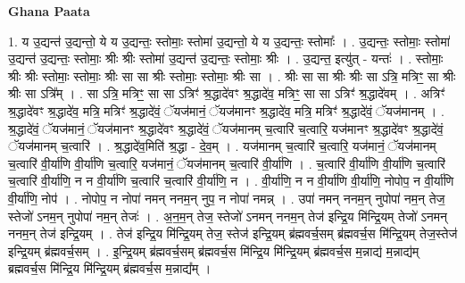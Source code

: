 \documentclass[17pt]{extarticle}
\begin{document}
\textbf{Ghana Paata } \newline

1. य उ॒द्यन्त॑ उ॒द्यन्तो॒ ये य उ॒द्यन्तः॒ स्तोमाः॒ स्तोमा॑ उ॒द्यन्तो॒ ये य उ॒द्यन्तः॒ स्तोमाः᳚ । . उ॒द्यन्तः॒ स्तोमाः॒ स्तोमा॑ उ॒द्यन्त॑ उ॒द्यन्तः॒ स्तोमाः॒ श्रीः श्रीः स्तोमा॑ उ॒द्यन्त॑ उ॒द्यन्तः॒ स्तोमाः॒ श्रीः । . उ॒द्यन्त॒ इत्यु॑त् - यन्तः॑ । . स्तोमाः॒ श्रीः श्रीः स्तोमाः॒ स्तोमाः॒ श्रीः सा सा श्रीः स्तोमाः॒ स्तोमाः॒ श्रीः सा । . श्रीः सा सा श्रीः श्रीः सा ऽत्रि॒ मत्रिꣳ॒॒ सा श्रीः श्रीः सा ऽत्रि᳚म् । . सा ऽत्रि॒ मत्रिꣳ॒॒ सा सा ऽत्रिꣳ॑ श्र॒द्धादे॑वꣳ श्र॒द्धादे॑व॒ मत्रिꣳ॒॒ सा सा ऽत्रिꣳ॑ श्र॒द्धादे॑वम् । . अत्रिꣳ॑ श्र॒द्धादे॑वꣳ श्र॒द्धादे॑व॒ मत्रि॒ मत्रिꣳ॑ श्र॒द्धादे॑वं॒ ॅयज॑मानं॒ ॅयज॑मानꣳ श्र॒द्धादे॑व॒ मत्रि॒ मत्रिꣳ॑ श्र॒द्धादे॑वं॒ ॅयज॑मानम् । . श्र॒द्धादे॑वं॒ ॅयज॑मानं॒ ॅयज॑मानꣳ श्र॒द्धादे॑वꣳ श्र॒द्धादे॑वं॒ ॅयज॑मानम् च॒त्वारि॑ च॒त्वारि॒ यज॑मानꣳ श्र॒द्धादे॑वꣳ श्र॒द्धादे॑वं॒ ॅयज॑मानम् च॒त्वारि॑ । . श्र॒द्धादे॑व॒मिति॑ श्र॒द्धा - दे॒व॒म् । . यज॑मानम् च॒त्वारि॑ च॒त्वारि॒ यज॑मानं॒ ॅयज॑मानम् च॒त्वारि॑ वी॒र्या॑णि वी॒र्या॑णि च॒त्वारि॒ यज॑मानं॒ ॅयज॑मानम् च॒त्वारि॑ वी॒र्या॑णि । . च॒त्वारि॑ वी॒र्या॑णि वी॒र्या॑णि च॒त्वारि॑ च॒त्वारि॑ वी॒र्या॑णि॒ न न वी॒र्या॑णि च॒त्वारि॑ च॒त्वारि॑ वी॒र्या॑णि॒ न । . वी॒र्या॑णि॒ न न वी॒र्या॑णि वी॒र्या॑णि॒ नोपोप॒ न वी॒र्या॑णि वी॒र्या॑णि॒ नोप॑ । . नोपोप॒ न नोपा॑ नमन् ननम॒न् नुप॒ न नोपा॑ नमन्न् । . उपा॑ नमन् ननम॒न् नुपोपा॑ नम॒न् तेज॒ स्तेजो॑ ऽनम॒न् नुपोपा॑ नम॒न् तेजः॑ । . अ॒न॒म॒न् तेज॒ स्तेजो॑ ऽनमन् ननम॒न् तेज॑ इन्द्रि॒य मि॑न्द्रि॒यम् तेजो॑ ऽनमन् ननम॒न् तेज॑ इन्द्रि॒यम् । . तेज॑ इन्द्रि॒य मि॑न्द्रि॒यम् तेज॒ स्तेज॑ इन्द्रि॒यम् ब्र॑ह्मवर्च॒सम् ब्र॑ह्मवर्च॒स मि॑न्द्रि॒यम् तेज॒स्तेज॑ इन्द्रि॒यम् ब्र॑ह्मवर्च॒सम् । . इ॒न्द्रि॒यम् ब्र॑ह्मवर्च॒सम् ब्र॑ह्मवर्च॒स मि॑न्द्रि॒य मि॑न्द्रि॒यम् ब्र॑ह्मवर्च॒स म॒न्नाद्य॑ म॒न्नाद्य॑म् ब्रह्मवर्च॒स मि॑न्द्रि॒य मि॑न्द्रि॒यम् ब्र॑ह्मवर्च॒स म॒न्नाद्य᳚म् । \newline
\end{document}
